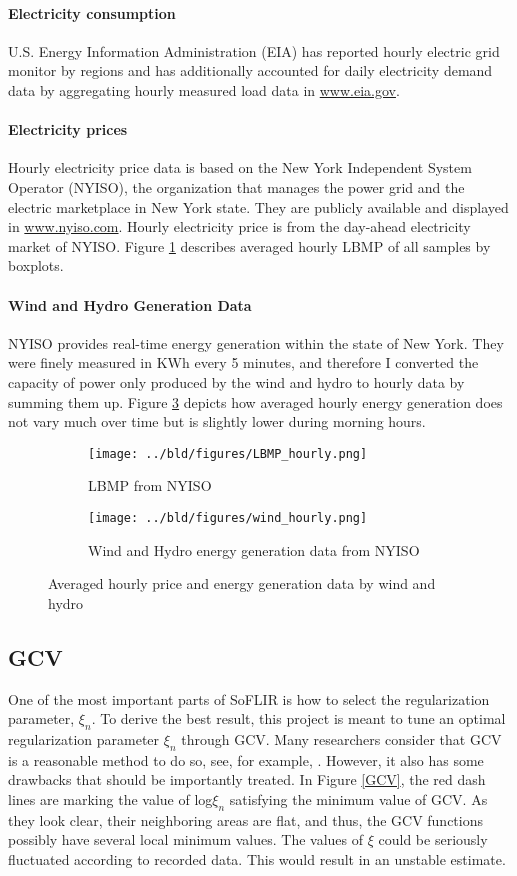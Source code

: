 \documentclass[11pt, a4paper, leqno]{article}
\begin{document}
\paragraph{Electricity consumption} U.S. Energy Information Administration (EIA) has reported hourly electric grid monitor by regions and has additionally accounted for daily electricity demand data by aggregating hourly measured load data in \href{www.eia.gov}{www.eia.gov}.
\paragraph{Electricity prices} Hourly electricity price data is based on the New York Independent System Operator (NYISO), the organization that manages the power grid and the electric marketplace in New York state. They are publicly available and displayed in \href{www.nyiso.com}{www.nyiso.com}. Hourly electricity price is from the day-ahead electricity market of NYISO. Figure \ref{fig:prc} describes averaged hourly LBMP of all samples by boxplots.
\paragraph{Wind and Hydro Generation Data} NYISO provides real-time energy generation within the state of New York. They were finely measured in KWh every 5 minutes, and therefore I converted the capacity of power only produced by the wind and hydro to hourly data by summing them up. Figure \ref{fig:wind} depicts how averaged hourly energy generation does not vary much over time but is slightly lower during morning hours.
\begin{figure}[H]
	\centering
	\begin{subfigure}{.5\textwidth}
		\centering
		\texttt{[image: ../bld/figures/LBMP\_hourly.png]}
		\caption{LBMP from NYISO}
		\label{fig:prc}
	\end{subfigure}%
	\begin{subfigure}{.5\textwidth}
		\centering
		\texttt{[image: ../bld/figures/wind\_hourly.png]}
		\caption{Wind and Hydro energy generation data from NYISO}
		\label{fig:wind}
	\end{subfigure}
	\caption{Averaged hourly price and energy generation data by wind and hydro}
\end{figure}

\subsection{GCV}
One of the most important parts of SoFLIR is how to select the regularization parameter, $\xi_n$. To derive the best result, this project is meant to tune an optimal regularization parameter $\xi_n$ through GCV. Many researchers consider that GCV is a reasonable method to do so, see, for example, \citet{Ramsay.2005}. However, it also has some drawbacks that should be importantly treated. In Figure \ref{GCV}, the red dash lines are marking the value of log$\xi_n$ satisfying the minimum value of GCV. As they look clear, their neighboring areas are flat, and thus, the GCV functions possibly have several local minimum values. The values of $\xi$ could be seriously fluctuated according to recorded data. This would result in an unstable estimate.
\end{document}
